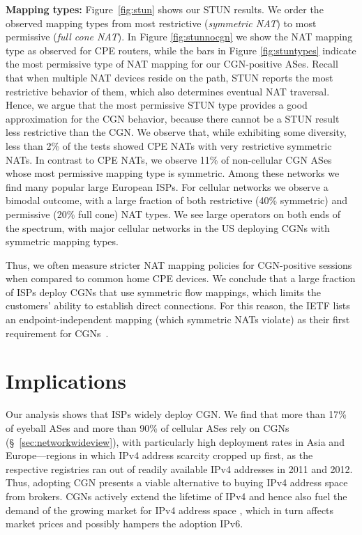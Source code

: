 \documentclass[10pt]{sig-alternate-05-2015}
\newcommand\xref[1]{\S~\ref{#1}}
\newcommand{\parax}[1]{\vspace{0.2em} \noindent \textbf{#1:}}
\begin{document}
{\parax{Mapping types}
Figure~\ref{fig:stun} shows our STUN results. We order the observed 
mapping types from most restrictive (\textit{symmetric NAT}) to most permissive 
(\textit{full cone NAT}).
In Figure \ref{fig:stunnocgn} we show the NAT mapping type as observed
for CPE routers, while the bars in Figure \ref{fig:stuntypes} indicate
the most permissive type of NAT mapping for our CGN-positive ASes.
Recall that when multiple NAT devices reside on the path, STUN reports the most restrictive behavior of them, which also determines 
eventual NAT traversal. Hence, we argue that the most permissive STUN type 
provides a good approximation for the CGN behavior, 
because there cannot be a STUN result less restrictive than the CGN. 
We observe that, while exhibiting some diversity, less than 2\% 
of the tests showed CPE NATs with very 
restrictive symmetric NATs. In contrast to CPE NATs, we observe 
11\%{} of non-cellular CGN ASes whose most permissive 
mapping type is symmetric. Among these networks we find many 
popular large European ISPs.
For cellular networks we observe a bimodal outcome, with a 
large fraction of both restrictive (40\%{} 
symmetric) and permissive (20\%{} full cone) NAT 
types. We see large operators on both ends of the spectrum, with major cellular 
networks in the US deploying CGNs with symmetric mapping types.

 


Thus, we often measure stricter NAT mapping policies for CGN-positive sessions 
when compared to common home CPE devices. We conclude that a large fraction of 
ISPs deploy CGNs that use symmetric flow mappings, which limits the customers' 
ability to establish direct connections. For this reason, the IETF lists an 
endpoint-independent mapping (which symmetric NATs violate) as their first 
requirement for CGNs~\cite{rfc4787,rfc5382}.

\section{Implications} 



Our analysis shows that ISPs widely deploy CGN. We find that more than 17\% 
of eyeball ASes and more than 90\% of cellular ASes rely on CGNs 
(\xref{sec:networkwideview}), with particularly high deployment rates in Asia 
and Europe---regions in which IPv4 address scarcity cropped up first, as the 
respective registries ran out of readily available IPv4 addresses in 2011 and 
2012. Thus, adopting CGN presents
a viable alternative to buying IPv4 address space from brokers.
CGNs actively extend the lifetime of IPv4 and hence also fuel the 
demand of the growing market for IPv4 address space \cite{RABP14}, which in 
turn affects market prices and possibly hampers the adoption IPv6.

}
\end{document}
